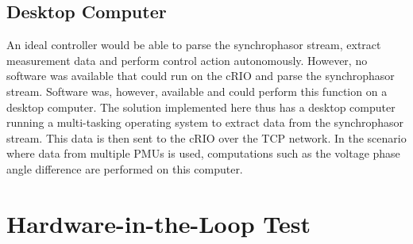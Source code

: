 \documentclass[conference]{IEEEtran}
\begin{document}
\subsection{Desktop Computer} An ideal controller would be able to parse the synchrophasor stream, extract measurement data and perform control action autonomously. However, no software was available that could run on the cRIO and parse the synchrophasor stream. Software \cite{SDK} was, however, available and could perform this function on a desktop computer. The solution implemented here thus has a desktop computer running a multi-tasking operating system to extract data from the synchrophasor stream. This data is then sent to the cRIO over the TCP network. In the scenario where data from multiple PMUs is used, computations such as the voltage phase angle difference are performed on this computer.

\section{Hardware-in-the-Loop Test} \label{HILtest}
\end{document}
